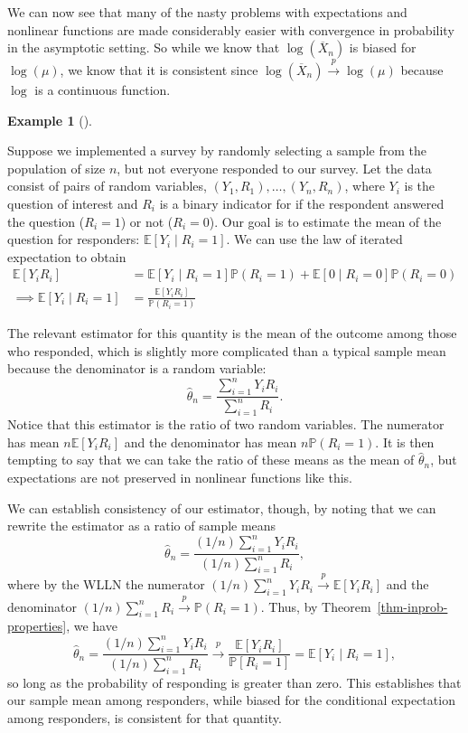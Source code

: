 \documentclass[
  letterpaper,
  DIV=11,
  numbers=noendperiod]{scrreprt}
\newcommand{\E}{\mathbb{E}}
\renewcommand{\P}{\mathbb{P}}
\newcommand{\Xbar}{\overline{X}}
\newcommand{\inprob}{\overset{p}{\to}}
\theoremstyle{definition}
\theoremstyle{plain}
\theoremstyle{definition}
\newtheorem{example}{Example}[chapter]
\theoremstyle{remark}
\begin{document}
We can now see that many of the nasty problems with expectations and
nonlinear functions are made considerably easier with convergence in
probability in the asymptotic setting. So while we know that
\(\log(\Xbar_n)\) is biased for \(\log(\mu)\), we know that it is
consistent since \(\log(\Xbar_n) \inprob \log(\mu)\) because \(\log\) is
a continuous function.

\begin{example}[]\protect\hypertarget{exm-nonresponse}{}\label{exm-nonresponse}

Suppose we implemented a survey by randomly selecting a sample from the
population of size \(n\), but not everyone responded to our survey. Let
the data consist of pairs of random variables,
\((Y_1, R_1), \ldots, (Y_n, R_n)\), where \(Y_i\) is the question of
interest and \(R_i\) is a binary indicator for if the respondent
answered the question (\(R_i = 1\)) or not (\(R_i = 0\)). Our goal is to
estimate the mean of the question for responders:
\(\E[Y_i \mid R_i = 1]\). We can use the law of iterated expectation to
obtain \[
\begin{aligned}
\E[Y_iR_i] &= \E[Y_i \mid R_i = 1]\P(R_i = 1) + \E[ 0 \mid R_i = 0]\P(R_i = 0) \\
\implies \E[Y_i \mid R_i = 1] &= \frac{\E[Y_iR_i]}{\P(R_i = 1)}
\end{aligned}
\]

The relevant estimator for this quantity is the mean of the outcome
among those who responded, which is slightly more complicated than a
typical sample mean because the denominator is a random variable: \[
\widehat{\theta}_n = \frac{\sum_{i=1}^n Y_iR_i}{\sum_{i=1}^n R_i}. 
\] Notice that this estimator is the ratio of two random variables. The
numerator has mean \(n\E[Y_iR_i]\) and the denominator has mean
\(n\P(R_i = 1)\). It is then tempting to say that we can take the ratio
of these means as the mean of \(\widehat{\theta}_n\), but expectations
are not preserved in nonlinear functions like this.

We can establish consistency of our estimator, though, by noting that we
can rewrite the estimator as a ratio of sample means \[
\widehat{\theta}_n = \frac{(1/n)\sum_{i=1}^n Y_iR_i}{(1/n)\sum_{i=1}^n R_i},
\] where by the WLLN the numerator
\((1/n)\sum_{i=1}^n Y_iR_i \inprob \E[Y_iR_i]\) and the denominator
\((1/n)\sum_{i=1}^n R_i \inprob \P(R_i = 1)\). Thus, by
Theorem~\ref{thm-inprob-properties}, we have \[
\widehat{\theta}_n = \frac{(1/n)\sum_{i=1}^n Y_iR_i}{(1/n)\sum_{i=1}^n R_i} \inprob \frac{\E[Y_iR_i]}{\P[R_i = 1]} = \E[Y_i \mid R_i = 1],
\] so long as the probability of responding is greater than zero. This
establishes that our sample mean among responders, while biased for the
conditional expectation among responders, is consistent for that
quantity.

\end{example}
\end{document}
